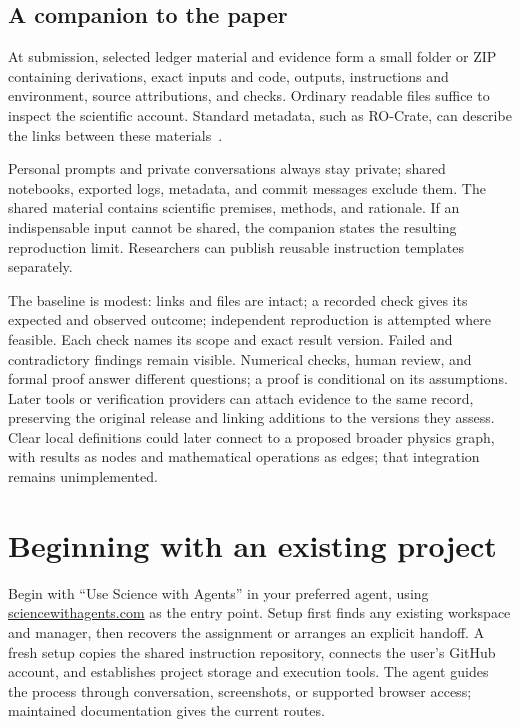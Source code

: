 \documentclass[11pt]{article}
\begin{document}
\subsection{A companion to the paper}
At submission, selected ledger material and evidence form a small folder or ZIP containing derivations, exact inputs and code, outputs, instructions and environment, source attributions, and checks. Ordinary readable files suffice to inspect the scientific account. Standard metadata, such as RO-Crate, can describe the links between these materials~\cite{rocrate}.

Personal prompts and private conversations always stay private; shared notebooks, exported logs, metadata, and commit messages exclude them. The shared material contains scientific premises, methods, and rationale. If an indispensable input cannot be shared, the companion states the resulting reproduction limit. Researchers can publish reusable instruction templates separately.

The baseline is modest: links and files are intact; a recorded check gives its expected and observed outcome; independent reproduction is attempted where feasible. Each check names its scope and exact result version. Failed and contradictory findings remain visible. Numerical checks, human review, and formal proof answer different questions; a proof is conditional on its assumptions. Later tools or verification providers can attach evidence to the same record, preserving the original release and linking additions to the versions they assess. Clear local definitions could later connect to a proposed broader physics graph, with results as nodes and mathematical operations as edges; that integration remains unimplemented.

\section{Beginning with an existing project}
Begin with ``Use Science with Agents'' in your preferred agent, using \href{https://sciencewithagents.com}{\mbox{sciencewithagents.com}} as the entry point. Setup first finds any existing workspace and manager, then recovers the assignment or arranges an explicit handoff. A fresh setup copies the shared instruction repository, connects the user's GitHub account, and establishes project storage and execution tools. The agent guides the process through conversation, screenshots, or supported browser access; maintained documentation gives the current routes.
\end{document}
